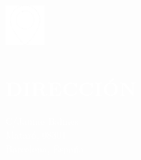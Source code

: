 \documentclass[../main.tex]{subfiles}
\begin{document}
    \hspace*{0.2cm}
    \begin{minipage}[t]{2cm}
        \vspace*{0.75cm}\includegraphics[width=1.5cm]{assets/location.png}
    \end{minipage}
    \begin{minipage}[t]{5cm}

        \vspace*{0.5cm}
        \section*{\textcolor{white}{DIRECCIÓN}}
        \vspace*{-0.25cm}
        \textcolor{white}{
            C/Jaume Balmes\\
            Mataró, 08301 \\
            Barcelona, España
        }
    \end{minipage}
\end{document}
